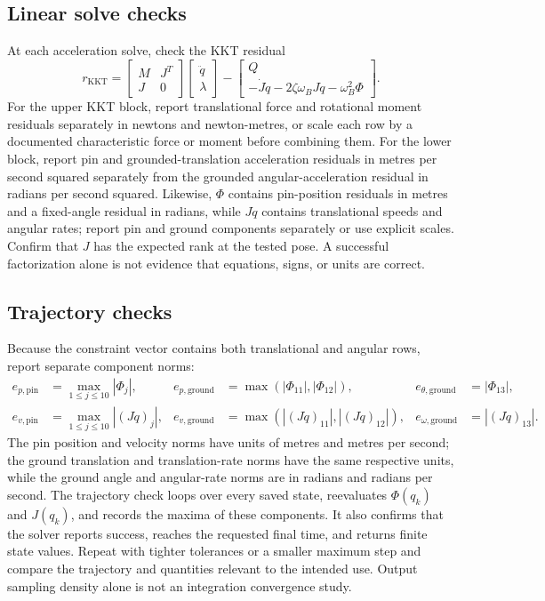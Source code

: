 \documentclass[../main.tex]{subfiles}
\begin{document}
\subsection{Linear solve checks}
At each acceleration solve, check the KKT residual
\begin{equation}
 r_{\mathrm{KKT}}=\begin{bmatrix}M&J^T\\J&0\end{bmatrix}
 \begin{bmatrix}\ddot q\\\lambda\end{bmatrix}-
 \begin{bmatrix}Q\\-\dot J\dot q-2\zeta\omega_BJ\dot q-\omega_B^2\Phi\end{bmatrix}.
\end{equation}
For the upper KKT block, report translational force and rotational moment residuals separately in newtons and newton-metres, or scale each row by a documented characteristic force or moment before combining them. For the lower block, report pin and grounded-translation acceleration residuals in metres per second squared separately from the grounded angular-acceleration residual in radians per second squared. Likewise, $\Phi$ contains pin-position residuals in metres and a fixed-angle residual in radians, while $J\dot q$ contains translational speeds and angular rates; report pin and ground components separately or use explicit scales. Confirm that $J$ has the expected rank at the tested pose. A successful factorization alone is not evidence that equations, signs, or units are correct.

\subsection{Trajectory checks}
Because the constraint vector contains both translational and angular rows, report separate component norms:
\begin{equation}
 \begin{aligned}
 e_{p,\mathrm{pin}}&=\max_{1\le j\le10}|\Phi_j|,&
 e_{p,\mathrm{ground}}&=\max(|\Phi_{11}|,|\Phi_{12}|),&
 e_{\theta,\mathrm{ground}}&=|\Phi_{13}|,\\
 e_{v,\mathrm{pin}}&=\max_{1\le j\le10}|(J\dot q)_j|,&
 e_{v,\mathrm{ground}}&=\max(|(J\dot q)_{11}|,|(J\dot q)_{12}|),&
 e_{\omega,\mathrm{ground}}&=|(J\dot q)_{13}|.
 \end{aligned}
\end{equation}
The pin position and velocity norms have units of metres and metres per second; the ground translation and translation-rate norms have the same respective units, while the ground angle and angular-rate norms are in radians and radians per second. The trajectory check loops over every saved state, reevaluates $\Phi(q_k)$ and $J(q_k)$, and records the maxima of these components. It also confirms that the solver reports success, reaches the requested final time, and returns finite state values. Repeat with tighter tolerances or a smaller maximum step and compare the trajectory and quantities relevant to the intended use. Output sampling density alone is not an integration convergence study.
\end{document}
